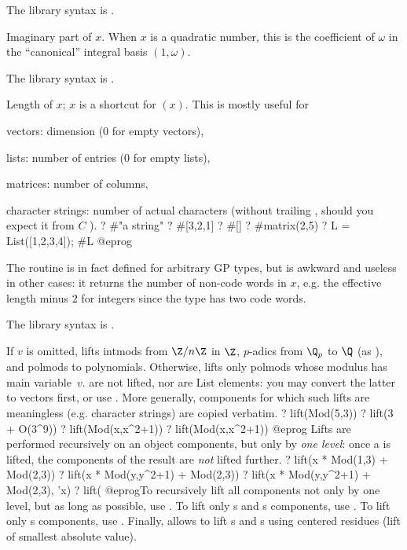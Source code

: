 The library syntax is .

\label{se:imag}
Imaginary part of $x$. When $x$ is a quadratic number, this is the
coefficient of $\omega$ in the ``canonical'' integral basis $(1,\omega)$.

The library syntax is .

\label{se:length}
Length of $x$; \kbd{\#}$x$ is a shortcut for $(x)$.
This is mostly useful for

\item vectors: dimension (0 for empty vectors),

\item lists: number of entries (0 for empty lists),

\item matrices: number of columns,

\item character strings: number of actual characters (without
trailing , should you expect it from $C$ ).
\bprog
 ? #"a string"
 ? #[3,2,1]
 ? #[]
 ? #matrix(2,5)
 ? L = List([1,2,3,4]); #L
@eprog

The routine is in fact defined for arbitrary GP types, but is awkward and
useless in other cases: it returns the number of non-code words in $x$, e.g.
the effective length minus 2 for integers since the  type has two code
words.

The library syntax is .

\label{se:lift}
If $v$ is omitted, lifts intmods from $\Z/n\Z$ in $\Z$,
$p$-adics from $\Q_p$ to $\Q$ (as ), and polmods to
polynomials. Otherwise, lifts only polmods whose modulus has main
variable~$v$.  are not lifted, nor are List elements: you may
convert the latter to vectors first, or use . More
generally, components for which such lifts are meaningless (e.g. character
strings) are copied verbatim.
\bprog
? lift(Mod(5,3))
? lift(3 + O(3^9))
? lift(Mod(x,x^2+1))
? lift(Mod(x,x^2+1))
@eprog
Lifts are performed recursively on an object components, but only
by \emph{one level}: once a  is lifted, the components of
the result are \emph{not} lifted further.
\bprog
? lift(x * Mod(1,3) + Mod(2,3))
? lift(x * Mod(y,y^2+1) + Mod(2,3))
? lift(x * Mod(y,y^2+1) + Mod(2,3), 'x)
? lift(%
@eprog\noindent To recursively lift all components not only by one level,
but as long as possible, use . To lift only s and
s components, use . To lift only s
components, use . Finally,  allows to lift
s and s using centered residues (lift of smallest
absolute value).

